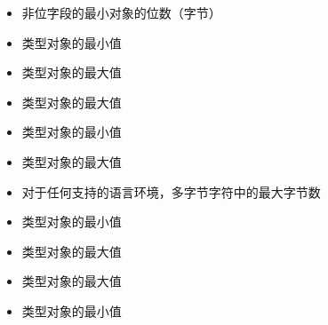 \begin{itemize}
  \item{非位字段的最小对象的位数（字节）
    \begin{itemize}
    \end{itemize}}
  \item{类型对象的最小值
    \begin{itemize}
    \end{itemize}}
  \item{类型对象的最大值
    \begin{itemize}
    \end{itemize}}
  \item{类型对象的最大值
    \begin{itemize}
    \end{itemize}}
  \item{类型对象的最小值
    \begin{itemize}
    \end{itemize}}
  \item{类型对象的最大值
    \begin{itemize}
    \end{itemize}}
  \item{对于任何支持的语言环境，多字节字符中的最大字节数
    \begin{itemize}
    \end{itemize}}
  \item{类型对象的最小值
    \begin{itemize}
    \end{itemize}}
  \item{类型对象的最大值
    \begin{itemize}
    \end{itemize}}
  \item{类型对象的最大值
    \begin{itemize}
    \end{itemize}}
  \item{类型对象的最小值
    \begin{itemize}

\end{itemize}}
\end{itemize}

